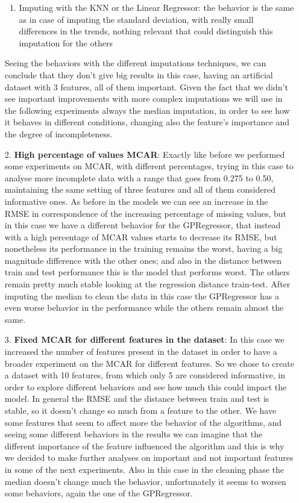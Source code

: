 \documentclass{Configuration_Files/PoliMi3i_thesis}
\begin{document}
\begin{enumerate}
\begin{enumerate}
    \item Imputing with the KNN or the Linear Regressor: the behavior is the same as in case of imputing the standard deviation, with really small differences in the trends, nothing relevant that could distinguish this imputation for the others
\end{enumerate}
Seeing the behaviors with the different imputations techniques, we can conclude that they don't give big results in this case, having an artificial dataset with 3 features, all of them important. Given the fact that we didn't see important improvements with more complex imputations we will use in the following experiments always the median imputation, in order to see how it behaves in different conditions, changing also the feature's importance and the degree of incompleteness. 
\item[2.] \textbf{High percentage of values MCAR}: Exactly like before we performed some experiments on MCAR, with different percentages, trying in this case to analyse more incomplete data with a range that goes from 0.275 to 0.50, maintaining the same setting of three features and all of them considered informative ones. As before in the models we can see an increase in the RMSE in correspondence of the increasing percentage of missing values, but in this case we have a different behavior for the GPRegressor, that instead with a high percentage of MCAR values starts to decrease its RMSE, but nonetheless its performance in the training remains the worst, having a big magnitude difference with the other ones; and also in the distance between train and test performance this is the model that performs worst. The others remain pretty much stable looking at the regression distance train-test. After imputing the median to clean the data in this case the GPRegressor has a even worse behavior in the performance while the others remain almost the same.
\item[3.] \textbf{Fixed MCAR for different features in the dataset}: In this case we increased the number of features present in the dataset in order to have a broader experiment on the MCAR for different features. So we chose to create a dataset with 10 features, from which only 5 are considered informative, in order to explore different behaviors and see how much this could impact the model. In general the RMSE and the distance between train and test is stable, so it doesn't change so much from a feature to the other. We have some features that seem to affect more the behavior of the algorithms, and
seeing some different behaviors in the results we can imagine that the different importance of the feature influenced the algorithm and this is why we decided to make further analyses on important and not important features in some of the next experiments. Also in this case in the cleaning phase the median doesn't change much the behavior, unfortunately it seems to worsen some behaviors, again the one of the GPRegressor.

\end{enumerate}
\end{document}
